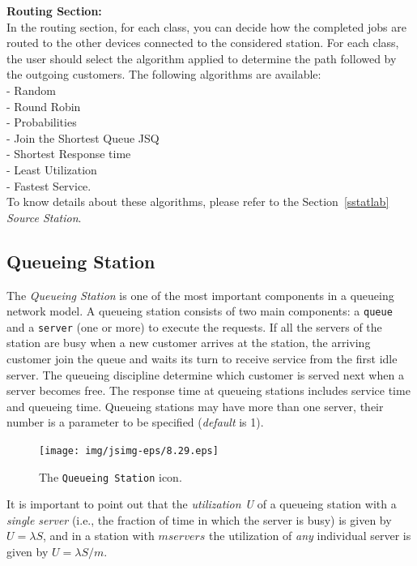 \noindent \textbf{Routing Section:}\\ In the routing section, for
each class, you can decide how the completed jobs are routed to
the other devices connected to the considered station.
For each class, the user should select the algorithm applied to
determine the path followed by the outgoing customers.
The following algorithms are available:\\
- Random\\  - Round Robin\\ - Probabilities\\   - Join the Shortest Queue JSQ\\
- Shortest Response time\\ - Least Utilization\\  - Fastest Service.\\

\noindent To know details about these algorithms, please refer to the
Section~\ref{sstatlab} \emph{Source Station}.

\subsection{Queueing Station}
 The \emph{Queueing Station} is one of the most
important components in a queueing network model. A queueing
station consists of two main components: a \texttt{queue} and a
\texttt{server} (one or more) to execute the requests. If all the
servers of the station are busy when a new customer arrives at the
station, the arriving customer join the queue and waits its turn
to receive service from the first idle server. The queueing
discipline determine which customer is served next when a server
becomes free. The response time at queueing stations includes
service time and queueing time. Queueing stations may have more
than one server, their number is a parameter to be specified
(\emph{default} is 1).
\begin{figure}[htb]
    \begin{center}
        \texttt{[image: img/jsimg-eps/8.29.eps]}
    \end{center}
    \caption{The \texttt{Queueing Station} icon.}
    \label{fig:questat}
\end{figure}
It is important to point out that the \emph{utilization U} of a
queueing station with a \emph{single server} (i.e., the fraction
of time in which the server is busy) is given by $U=\lambda S$,
and in a station with $m servers$ the utilization of \emph{any}
individual server
is given by $U=\lambda S /m$.\\

